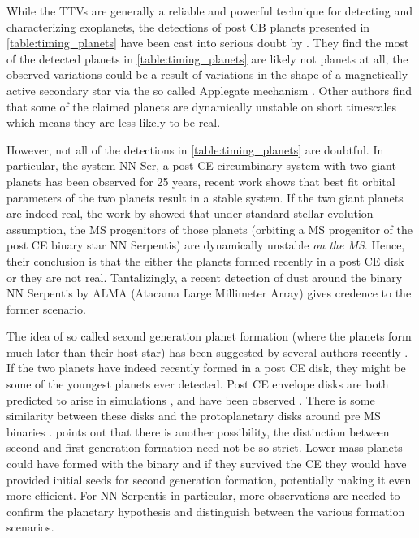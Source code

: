 \documentclass[twoside,openright,titlepage,numbers=noenddot,headinclude,%
                footinclude=true,cleardoublepage=empty,abstractoff, 
                BCOR=5mm,paper=a4,fontsize=11pt,%
                american,%
                ]{scrreprt}%
\begin{document}
While the TTVs are generally a reliable and powerful technique for detecting
and characterizing  exoplanets, the detections of post CB planets presented 
in \cref{table:timing_planets} have been cast into serious doubt by
\citet{zorotovic}. They find the most of the detected planets in 
\cref{table:timing_planets} are likely not planets at all, 
the observed variations could be  
a result of variations in the shape of a magnetically active 
secondary star via the so called Applegate mechanism \citep{applegate}. Other
authors \citep{hinse2012} find that some of the claimed planets
are dynamically unstable on short timescales which means they are less likely
to be real.

However, not all of the detections in \cref{table:timing_planets} are doubtful. 
In particular, the system NN Ser, a post CE circumbinary system with 
two giant planets has been observed for 25 years, recent work \citep{Marsh2013}
shows that best fit orbital parameters of the two planets result in a stable
system. If the two giant planets are indeed real, the work by 
\citet{Mustill2013a} showed that under standard stellar evolution assumption, 
the MS progenitors of those planets (orbiting a MS progenitor of the post CE
binary star NN Serpentis) are dynamically unstable \emph{on the MS}. Hence, 
their conclusion is that the either the planets formed recently in a post CE
disk or they are not real. Tantalizingly, a recent detection of dust around
the binary NN Serpentis by ALMA (Atacama Large Millimeter Array) 
gives credence to the former
scenario.

The idea of so called second generation planet formation (where the planets
form much later than their host star) has been suggested by several authors 
recently \citep{Perets2010,Schleicher2014,Volschow2014}. If the two planets
have indeed recently formed in a post CE disk, they might be some of the
youngest planets ever detected. Post CE envelope disks are both predicted
to arise in simulations \citep{Ivanova2013}, and have been observed 
\citep{vanWinckel2009}. There is some similarity between these disks and 
the protoplanetary disks around pre MS binaries \citep{deRuyter2006}. 
\citet{Perets2010} points out that there is another possibility, the distinction
between second and first generation formation need not be so strict. Lower
mass planets could have formed with the binary and if they survived the 
CE they would have provided initial seeds for second generation formation,
potentially making it even more efficient. For NN Serpentis in particular, 
more observations are needed to confirm the planetary hypothesis and 
distinguish between the various formation scenarios. 
\end{document}

